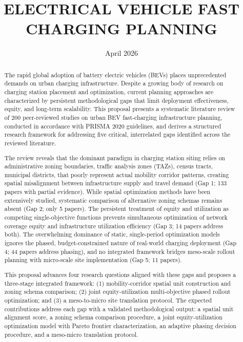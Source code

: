 \documentclass[letterpaper, 12pt, oneside, doublespacing]{Thesis}
\title{ELECTRICAL VEHICLE FAST CHARGING PLANNING}
\date{April 2026}
\begin{document}
\frontmatter
\maketitle

\fancyhead{}
\fancyfoot[C]{\thepage}
\pagestyle{fancy}

\begin{abstract}
The rapid global adoption of battery electric vehicles (BEVs) places unprecedented demands on urban charging infrastructure. Despite a growing body of research on charging station placement and optimization, current planning approaches are characterized by persistent methodological gaps that limit deployment effectiveness, equity, and long-term scalability. This proposal presents a systematic literature review of 200 peer-reviewed studies on urban BEV fast-charging infrastructure planning, conducted in accordance with PRISMA 2020 guidelines, and derives a structured research framework for addressing five critical, interrelated gaps identified across the reviewed literature.

The review reveals that the dominant paradigm in charging station siting relies on administrative zoning boundaries, traffic analysis zones (TAZs), census tracts, municipal districts, that poorly represent actual mobility corridor patterns, creating spatial misalignment between infrastructure supply and travel demand (Gap 1; 133 papers with partial evidence). While spatial optimization methods have been extensively studied, systematic comparison of alternative zoning schemas remains absent (Gap 2; only 5 papers). The persistent treatment of equity and utilization as competing single-objective functions prevents simultaneous optimization of network coverage equity and infrastructure utilization efficiency (Gap 3; 14 papers address both). The overwhelming dominance of static, single-period optimization models ignores the phased, budget-constrained nature of real-world charging deployment (Gap 4; 44 papers address phasing), and no integrated framework bridges meso-scale rollout planning with micro-scale site implementation (Gap 5; 11 papers).

This proposal advances four research questions aligned with these gaps and proposes a three-stage integrated framework: (1) mobility-corridor spatial unit construction and zoning schema comparison; (2) joint equity-utilization multi-objective phased rollout optimization; and (3) a meso-to-micro site translation protocol. The expected contributions address each gap with a validated methodological output: a spatial unit alignment score, a zoning schema comparison procedure, a joint equity-utilization optimization model with Pareto frontier characterization, an adaptive phasing decision procedure, and a meso-micro translation protocol.



\end{abstract}
\end{document}
